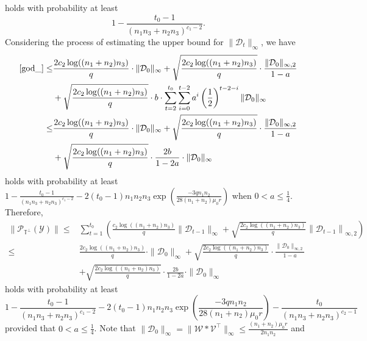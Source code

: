 \documentclass[twoside,12pt]{article}
\begin{document}
holds with probability at least   
\begin{equation}\label{eqn:probability42infty}
    1-\frac{t_0-1}{(n_1n_3+n_2n_3)^{c_1-2}}.
\end{equation}
Considering the process of estimating the upper bound for $\|\mathcal{D}_{t}\|_{\infty}$, we  have
\begin{align*}
    \eqref{god_}\leq& \frac{2c_{2}\log((n_1+n_2)n_3)}{q}\cdot\|\mathcal{D}_0\|_{\infty} 
    +\sqrt{\frac{2c_{2}\log((n_1+n_2)n_3)}{q}} \cdot  \frac{\|\mathcal{D}_0\|_{\infty,2}}{1-a} \notag \\
    &+\sqrt{\frac{2c_{2}\log((n_1+n_2)n_3)}{q}}\cdot b\cdot \sum_{t=2}^{t_0}\sum_{i=0}^{t-2}a^i\left(\frac{1}{2}\right)^{t-2-i}\|\mathcal{D}_0\|_{\infty} \\
    \leq& \frac{2c_{2}\log((n_1+n_2)n_3)}{q}\cdot 
 \|\mathcal{D}_0\|_{\infty} 
    +\sqrt{\frac{2c_{2}\log((n_1+n_2)n_3)}{q}}   \cdot\frac{\|\mathcal{D}_0\|_{\infty,2}}{1-a} \\
    &+\sqrt{\frac{2c_{2}\log((n_1+n_2)n_3)}{q}}  \cdot \frac{2b}{1-2a}\cdot \|\mathcal{D}_0\|_{\infty} 
\end{align*}
holds with probability at least $ 1-  \frac{t_0-1}{(n_1n_3+n_2n_3)^{c_1-2}}-2(t_0-1)n_{1}n_{2}n_{3}\exp\left(\frac{-3qn_{1}n_{2}}{28(n_1+n_2)\mu_{0}r}\right)$ when  %
$0<a\leq \frac{1}{4}$. Therefore,
\begin{align*}
\|\mathcal{P}_{\mathbb{T}^{\perp}}\left(\mathcal{Y}\right)\|\leq& \sum\limits_{t=1}^{t_0}\left(\frac{c_{2}\log((n_1+n_2)n_3)}{q}\|\mathcal{D}_{t-1}\|_{\infty}+\sqrt{\frac{2c_{2}\log((n_1+n_2)n_3)}{q}}\left\|\mathcal{D}_{t-1}\right\|_{\infty,2}\right)\\
\leq& \frac{2c_{2}\log((n_1+n_2)n_3)}{q}\cdot 
 \|\mathcal{D}_0\|_{\infty} 
    +\sqrt{\frac{2c_{2}\log((n_1+n_2)n_3)}{q}}   \cdot\frac{\|\mathcal{D}_0\|_{\infty,2}}{1-a} \\
    &+\sqrt{\frac{2c_{2}\log((n_1+n_2)n_3)}{q}}  \cdot \frac{2b}{1-2a}\cdot \|\mathcal{D}_0\|_{\infty} 
\end{align*}
holds with probability at least 
\[ 1-  \frac{t_0-1}{(n_1n_3+n_2n_3)^{c_1-2}}-2(t_0-1)n_{1}n_{2}n_{3}\exp\left(\frac{-3qn_{1}n_{2}}{28(n_1+n_2)\mu_{0}r}\right)-\frac{t_0} {(n_1n_3+n_2n_3)^{c_2-1}}\] provided that  
$0<a\leq \frac{1}{4}$. 
Note that $\|\mathcal{D}_0\|_{\infty}=\|\mathcal{W}*\mathcal{V}^\top\|_{\infty}\leq \frac{(n_1+n_2)\mu_0r}{2n_1n_2}$ and 
\end{document}
